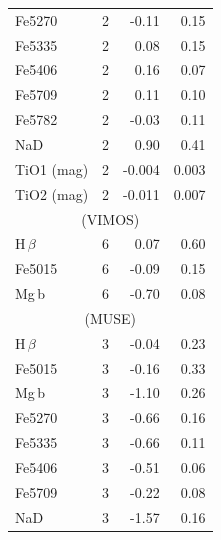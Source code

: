 \begin{table}
\begin{threeparttable}
\begin{tabular*}{0.8\textwidth}{@{\extracolsep{\fill}}l r r r}
					Fe5270 		& 2 		& -0.11\leavevmode\phantom{0}& 0.15\leavevmode\phantom{0}	\\
					Fe5335 		& 2 		& 0.08\leavevmode\phantom{0}& 0.15\leavevmode\phantom{0}	\\
					Fe5406 		& 2 		& 0.16\leavevmode\phantom{0}& 0.07\leavevmode\phantom{0}	\\
					Fe5709 		& 2 		& 0.11\leavevmode\phantom{0}& 0.10\leavevmode\phantom{0}	\\
					Fe5782 		& 2 		& -0.03\leavevmode\phantom{0}& 0.11\leavevmode\phantom{0}	\\
					NaD 		& 2 		& 0.90\leavevmode\phantom{0}& 0.41\leavevmode\phantom{0}	\\
					TiO1 (mag)	& 2 		& -0.004	& 0.003	\\
					TiO2 (mag)	& 2 		& -0.011	& 0.007	\\
					\hline
					\multicolumn{4}{c}{\citet{Ogando2008} (VIMOS)} \\
					\hline
					H\,$\beta$ 	& 6 		& 0.07\leavevmode\phantom{0}& 0.60\leavevmode\phantom{0}	\\
					Fe5015 		& 6 		& -0.09\leavevmode\phantom{0}& 0.15\leavevmode\phantom{0}	\\
					Mg\,b 		& 6 		& -0.70\leavevmode\phantom{0}& 0.08\leavevmode\phantom{0}	\\
					\hline
					\multicolumn{4}{c}{\citet{Ogando2008} (MUSE)} \\
					\hline
					H\,$\beta$ 	& 3 		& -0.04\leavevmode\phantom{0}& 0.23\leavevmode\phantom{0}	\\ 
					Fe5015 		& 3 		& -0.16\leavevmode\phantom{0}& 0.33\leavevmode\phantom{0}	\\ 
					Mg\,b 		& 3 		& -1.10\leavevmode\phantom{0}& 0.26\leavevmode\phantom{0}	\\
					Fe5270 		& 3 		& -0.66\leavevmode\phantom{0}& 0.16\leavevmode\phantom{0}	\\
					Fe5335 		& 3 		& -0.66\leavevmode\phantom{0}& 0.11\leavevmode\phantom{0}	\\
					Fe5406 		& 3 		& -0.51\leavevmode\phantom{0}& 0.06\leavevmode\phantom{0}	\\
					Fe5709 		& 3 		& -0.22\leavevmode\phantom{0}& 0.08\leavevmode\phantom{0}	\\
					NaD 		& 3 		& -1.57\leavevmode\phantom{0}& 0.16\leavevmode\phantom{0}	\\
					\hline
					\hline
				\end{tabular*}
				\begin{tablenotes}
				\footnotesize

\end{tablenotes}
\end{threeparttable}
\end{table}
